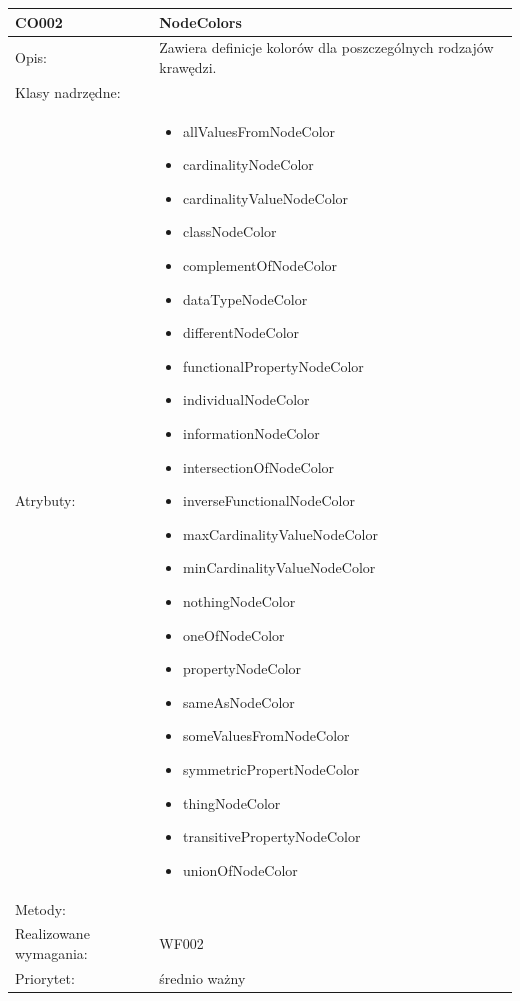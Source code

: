 \begin{center}
\begin{longtable}{|m{3cm}|m{9cm}|}
CO002 & NodeColors \\ \hline
Opis: & Zawiera definicje kolorów dla poszczególnych rodzajów krawędzi.   \\ \hline
Klasy nadrzędne: &     \\ \hline
Atrybuty: & \begin{itemize}
 \item allValuesFromNodeColor
 \item cardinalityNodeColor
 \item cardinalityValueNodeColor
 \item classNodeColor
 \item complementOfNodeColor
 \item dataTypeNodeColor
 \item differentNodeColor
 \item functionalPropertyNodeColor
 \item individualNodeColor
 \item informationNodeColor
 \item intersectionOfNodeColor
 \item inverseFunctionalNodeColor
 \item maxCardinalityValueNodeColor
 \item minCardinalityValueNodeColor
 \item nothingNodeColor
 \item oneOfNodeColor
 \item propertyNodeColor
 \item sameAsNodeColor
 \item someValuesFromNodeColor
 \item symmetricPropertNodeColor
 \item thingNodeColor
 \item transitivePropertyNodeColor
 \item unionOfNodeColor 
\end{itemize}
 \\ \hline
Metody: & %
  \\ \hline
Realizowane wymagania: & WF002 \\ \hline
Priorytet: & średnio ważny \\ \hline


\end{longtable}


\end{center}

